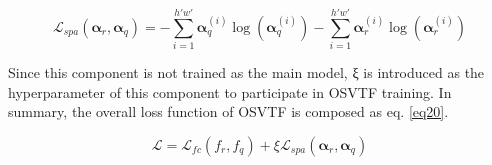 \begin{equation}
\label{eq19}
  \mathcal{L}_{spa} (\boldsymbol{\alpha}_r,\boldsymbol{\alpha}_q ) = -\sum_{i=1}^{h'w'} \boldsymbol{\alpha}_q^{(i)}  \log⁡(\boldsymbol{\alpha}_q^{(i)}) 
  - \sum_{i=1}^{h'w'}\boldsymbol{\alpha}_r^{(i)}  \log⁡(\boldsymbol{\alpha}_r^{(i)})
\end{equation}

Since this component is not trained as the main model, ξ is introduced as the hyperparameter of this component to participate in OSVTF training. In summary, the overall loss function of OSVTF is composed as eq. \ref{eq20}.

\begin{equation}
\label{eq20}
  \mathcal{L} = \mathcal{L}_{fc} (f_r,f_q) + \xi\mathcal{L}_{spa} (\boldsymbol{\alpha}_r,\boldsymbol{\alpha}_q)
\end{equation}
